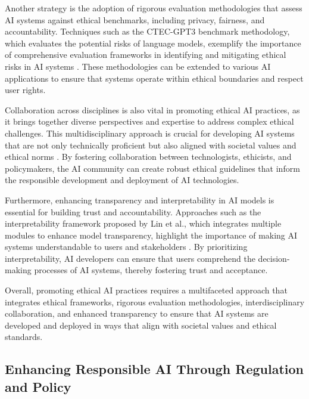 Another strategy is the adoption of rigorous evaluation methodologies that assess AI systems against ethical benchmarks, including privacy, fairness, and accountability. Techniques such as the CTEC-GPT3 benchmark methodology, which evaluates the potential risks of language models, exemplify the importance of comprehensive evaluation frameworks in identifying and mitigating ethical risks in AI systems \cite{mcguffie2020radicalizationrisksgpt3advanced}. These methodologies can be extended to various AI applications to ensure that systems operate within ethical boundaries and respect user rights.



Collaboration across disciplines is also vital in promoting ethical AI practices, as it brings together diverse perspectives and expertise to address complex ethical challenges. This multidisciplinary approach is crucial for developing AI systems that are not only technically proficient but also aligned with societal values and ethical norms \cite{korre2023takesvillagemultidisciplinaritycollaboration}. By fostering collaboration between technologists, ethicists, and policymakers, the AI community can create robust ethical guidelines that inform the responsible development and deployment of AI technologies.



Furthermore, enhancing transparency and interpretability in AI models is essential for building trust and accountability. Approaches such as the interpretability framework proposed by Lin et al., which integrates multiple modules to enhance model transparency, highlight the importance of making AI systems understandable to users and stakeholders \cite{lin2023interpretabilityframeworksimilarcase}. By prioritizing interpretability, AI developers can ensure that users comprehend the decision-making processes of AI systems, thereby fostering trust and acceptance.



Overall, promoting ethical AI practices requires a multifaceted approach that integrates ethical frameworks, rigorous evaluation methodologies, interdisciplinary collaboration, and enhanced transparency to ensure that AI systems are developed and deployed in ways that align with societal values and ethical standards.



\subsection{Enhancing Responsible AI Through Regulation and Policy} \label{subsec:Enhancing Responsible AI Through Regulation and Policy}

